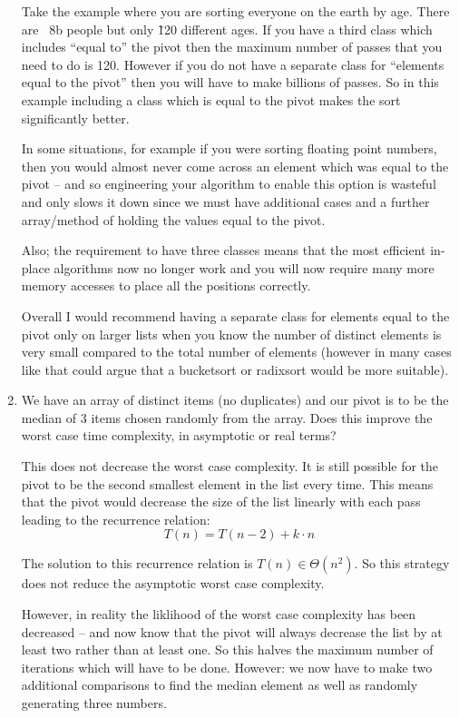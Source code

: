 \documentclass[10pt,\jkfside,a4paper]{article}
\begin{document}
\begin{enumerate}
Take the example where you are sorting everyone on the earth by age. There are ~8b people but 
only \~120 different ages. If you have a third class which includes ``equal to'' the pivot then 
the maximum number of passes that you need to do is 120. However if you do not have a separate 
class for ``elements equal to the pivot'' then you will have to make billions of 
passes. So in this example including a class which is equal to the 
pivot makes the sort significantly better.

In some situations, for example if you were sorting floating point numbers, then you would almost 
never 
come across an element which was equal to the pivot -- and so engineering your algorithm to enable 
this option is wasteful and only slows it down since we must have additional cases and a further 
array/method of holding the values equal to the pivot.

Also; the requirement to have three classes means that the most efficient in-place algorithms 
now no longer work and you will now require many more memory accesses to place all the positions 
correctly.

Overall I would recommend having a separate class for elements equal to the pivot only 
on larger lists when you know the number 
of distinct elements is very small compared to the total number of elements (however in many 
cases like that could argue that a bucketsort or radixsort would be more suitable).

\item We have an array of distinct items (no duplicates) and our pivot is to be the median 
of 3 items chosen randomly from the array. Does this improve the worst case time complexity, 
in asymptotic or real terms?

This does not decrease the worst case complexity. It is still possible for the pivot to be the 
second smallest element in the list every time. This means that the pivot would decrease 
the size of the list linearly with each pass leading to the recurrence relation:
\begin{equation}
T(n) = T(n - 2) + k\cdot n
\end{equation}

The solution to this recurrence relation is $T(n) \in \Theta(n^2)$. So this strategy does not 
reduce the asymptotic worst case complexity.

However, in reality the liklihood of the worst case complexity has been decreased -- and now 
know that the pivot will always decrease the list by at least two rather than at least one. So 
this halves the maximum number of iterations which will have to be done.
However: we now have to make two additional comparisons to find the median element as well as 
randomly generating three numbers.


\end{enumerate}
\end{document}
